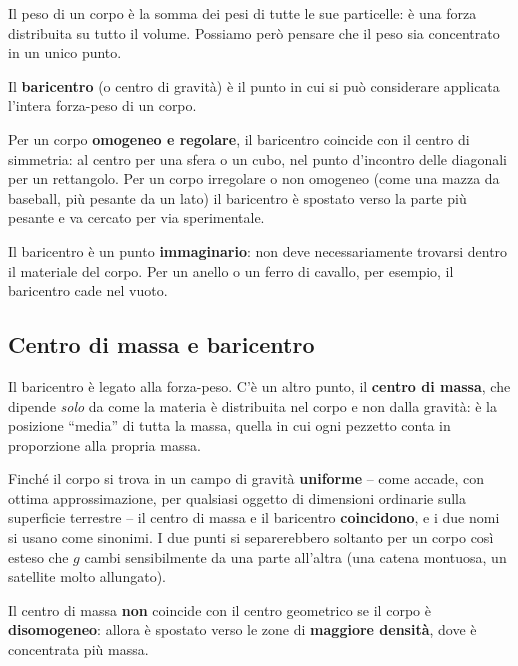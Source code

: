 Il peso di un corpo è la somma dei pesi di tutte le sue particelle: è una forza distribuita su tutto il volume. Possiamo però pensare che il peso sia concentrato in un unico punto.

\begin{definizione}
Il \textbf{baricentro} (o centro di gravità) è il punto in cui si può considerare applicata l'intera forza-peso di un corpo.
\end{definizione}

Per un corpo \textbf{omogeneo e regolare}, il baricentro coincide con il centro di simmetria: al centro per una sfera o un cubo, nel punto d'incontro delle diagonali per un rettangolo. Per un corpo irregolare o non omogeneo (come una mazza da baseball, più pesante da un lato) il baricentro è spostato verso la parte più pesante e va cercato per via sperimentale.

\begin{remark}
Il baricentro è un punto \textbf{immaginario}: non deve necessariamente trovarsi dentro il materiale del corpo. Per un anello o un ferro di cavallo, per esempio, il baricentro cade nel vuoto.
\end{remark}

\subsection{Centro di massa e baricentro}
Il baricentro è legato alla forza-peso. C'è un altro punto, il \textbf{centro di massa}, che dipende \emph{solo} da come la materia è distribuita nel corpo e non dalla gravità: è la posizione ``media'' di tutta la massa, quella in cui ogni pezzetto conta in proporzione alla propria massa.

Finché il corpo si trova in un campo di gravità \textbf{uniforme} -- come accade, con ottima approssimazione, per qualsiasi oggetto di dimensioni ordinarie sulla superficie terrestre -- il centro di massa e il baricentro \textbf{coincidono}, e i due nomi si usano come sinonimi. I due punti si separerebbero soltanto per un corpo così esteso che $g$ cambi sensibilmente da una parte all'altra (una catena montuosa, un satellite molto allungato).

Il centro di massa \textbf{non} coincide con il centro geometrico se il corpo è \textbf{disomogeneo}: allora è spostato verso le zone di \textbf{maggiore densità}, dove è concentrata più massa.


